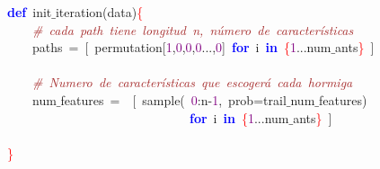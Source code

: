 \noindent
\mbox{}\textbf{\textcolor{Blue}{def}}\ init$\_$iteration\textcolor{BrickRed}{(}data\textcolor{BrickRed}{)}\textcolor{Red}{\{} \\
\mbox{}\ \ \ \ \textit{\textcolor{Brown}{\#\ cada\ path\ tiene\ longitud\ n,\ número\ de\ características}} \\
\mbox{}\ \ \ \ paths\ \textcolor{BrickRed}{=}\ \textcolor{BrickRed}{[}\ permutation\textcolor{BrickRed}{[}\textcolor{Purple}{1}\textcolor{BrickRed}{,}\textcolor{Purple}{0}\textcolor{BrickRed}{,}\textcolor{Purple}{0}\textcolor{BrickRed}{,}\textcolor{Purple}{0}\textcolor{BrickRed}{...,}\textcolor{Purple}{0}\textcolor{BrickRed}{]}\ \textbf{\textcolor{Blue}{for}}\ i\ \textbf{\textcolor{Blue}{in}}\ \textcolor{Red}{\{}\textcolor{Purple}{1}\textcolor{BrickRed}{...}num$\_$ants\textcolor{Red}{\}}\ \textcolor{BrickRed}{]} \\
\mbox{} \\
\mbox{}\ \ \ \ \textit{\textcolor{Brown}{\#\ Numero\ de\ características\ que\ escogerá\ cada\ hormiga}} \\
\mbox{}\ \ \ \ num$\_$features\ \textcolor{BrickRed}{=}\ \ \textcolor{BrickRed}{[}\ sample\textcolor{BrickRed}{(}\ \textcolor{Purple}{0}\textcolor{BrickRed}{:}n\textcolor{BrickRed}{-}\textcolor{Purple}{1}\textcolor{BrickRed}{,}\ prob\textcolor{BrickRed}{=}trail$\_$num$\_$features\textcolor{BrickRed}{)} \\
\mbox{}\ \ \ \ \ \ \ \ \ \ \ \ \ \ \ \ \ \ \ \ \ \ \ \ \ \ \ \ \ \textbf{\textcolor{Blue}{for}}\ i\ \textbf{\textcolor{Blue}{in}}\ \textcolor{Red}{\{}\textcolor{Purple}{1}\textcolor{BrickRed}{...}num$\_$ants\textcolor{Red}{\}}\ \textcolor{BrickRed}{]} \\
\mbox{} \\
\mbox{}\textcolor{Red}{\}} \\
\mbox{}
